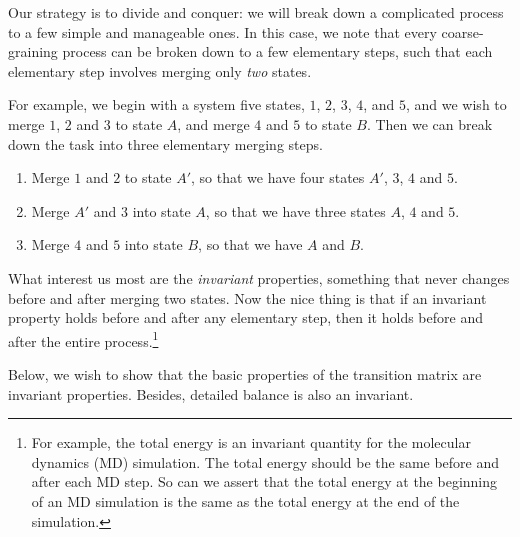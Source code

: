 \documentclass[12pt]{article}
\begin{document}
Our strategy is to divide and conquer:
we will break down a complicated process
to a few simple and manageable ones.
%
In this case, we note that every coarse-graining process
can be broken down to a few elementary steps,
such that each elementary step
involves merging only \emph{two} states.

For example, we begin with a system five states,
$1$, $2$, $3$, $4$, and $5$,
and we wish to merge $1$, $2$ and $3$
to state $A$, and merge $4$ and $5$
to state $B$.
%
Then we can break down the task into
three elementary merging steps.
\begin{enumerate}
  \item
    Merge $1$ and $2$ to state $A'$,
    so that we have four states
    $A'$, $3$, $4$ and $5$.

  \item
    Merge $A'$ and $3$ into state $A$,
    so that we have three states
    $A$, $4$ and $5$.

  \item
    Merge $4$ and $5$ into state $B$,
    so that we have
    $A$ and $B$.
\end{enumerate}

What interest us most are the \emph{invariant} properties,
something that never changes before and after
merging two states.
%
Now the nice thing is that if an invariant property
holds before and after any elementary step,
then it holds before and after the entire
process.\footnote{For example,
  the total energy is an invariant quantity
  for the molecular dynamics (MD) simulation.
  The total energy should be the same before and after
  each MD step. So can we assert that the total
  energy at the beginning of an MD simulation
  is the same as the total energy at the end
  of the simulation.
}

Below, we wish to show that the basic properties
of the transition matrix are invariant properties.
%
Besides, detailed balance is also an invariant.



%
%
\end{document}
